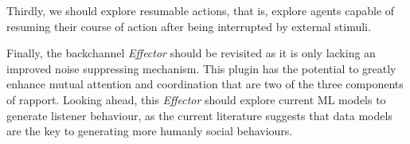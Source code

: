 Thirdly, we should explore resumable actions, that is, explore agents capable of resuming their course of action after being interrupted by external stimuli.

Finally, the backchannel \textit{Effector} should be revisited as it is only lacking an improved noise suppressing mechanism. This plugin has the potential to greatly enhance mutual attention and coordination that are two of the three components of rapport. Looking ahead, this \textit{Effector} should explore current \ac{ML} models to generate listener behaviour, as the current literature suggests that data models are the key to generating more humanly social behaviours.